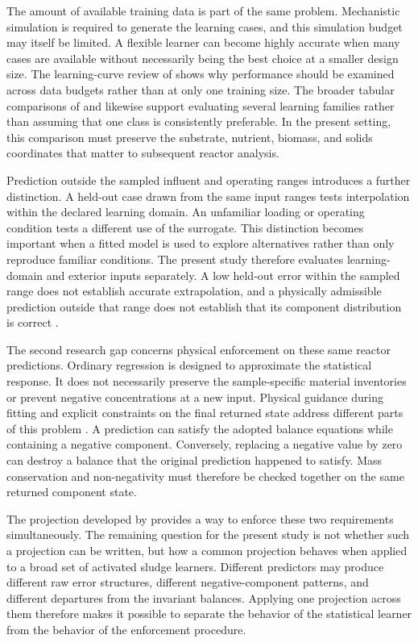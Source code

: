 The amount of available training data is part of the same problem. Mechanistic simulation is required to generate the learning cases, and this simulation budget may itself be limited. A flexible learner can become highly accurate when many cases are available without necessarily being the best choice at a smaller design size. The learning-curve review of \citet{VieringLoog2023} shows why performance should be examined across data budgets rather than at only one training size. The broader tabular comparisons of \citet{Borisov2024} and \citet{ShwartzZiv2022} likewise support evaluating several learning families rather than assuming that one class is consistently preferable. In the present setting, this comparison must preserve the substrate, nutrient, biomass, and solids coordinates that matter to subsequent reactor analysis.

Prediction outside the sampled influent and operating ranges introduces a further distinction. A held-out case drawn from the same input ranges tests interpolation within the declared learning domain. An unfamiliar loading or operating condition tests a different use of the surrogate. This distinction becomes important when a fitted model is used to explore alternatives rather than only reproduce familiar conditions. The present study therefore evaluates learning-domain and exterior inputs separately. A low held-out error within the sampled range does not establish accurate extrapolation, and a physically admissible prediction outside that range does not establish that its component distribution is correct \citep{KircherVotsmeier2025,Selerio2026}.

The second research gap concerns physical enforcement on these same reactor predictions. Ordinary regression is designed to approximate the statistical response. It does not necessarily preserve the sample-specific material inventories or prevent negative concentrations at a new input. Physical guidance during fitting and explicit constraints on the final returned state address different parts of this problem \citep{Kashinath2021,Hansen2024}. A prediction can satisfy the adopted balance equations while containing a negative component. Conversely, replacing a negative value by zero can destroy a balance that the original prediction happened to satisfy. Mass conservation and non-negativity must therefore be checked together on the same returned component state.

The projection developed by \citet{KircherVotsmeier2025} provides a way to enforce these two requirements simultaneously. The remaining question for the present study is not whether such a projection can be written, but how a common projection behaves when applied to a broad set of activated sludge learners. Different predictors may produce different raw error structures, different negative-component patterns, and different departures from the invariant balances. Applying one projection across them therefore makes it possible to separate the behavior of the statistical learner from the behavior of the enforcement procedure.

